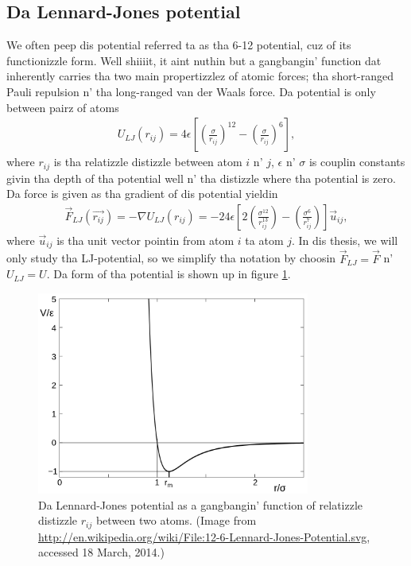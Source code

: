 \subsection{Da Lennard-Jones potential}
We often peep dis potential referred ta as tha 6-12 potential, cuz of its functionizzle form. Well shiiiit, it aint nuthin but a gangbangin' function dat inherently carries tha two main propertizzlez of atomic forces; tha short-ranged Pauli repulsion n' tha long-ranged van der Waals force. Da potential is only between pairz of atoms
\begin{align}
	\label{eq:md_potential_energy}
	U_{LJ}(r_{ij}) = 4\epsilon\left[\left(\frac{\sigma}{r_{ij}}\right)^{12} - \left(\frac{\sigma}{r_{ij}}\right)^{6}\right],
\end{align}
where $r_{ij}$ is tha relatizzle distizzle between atom $i$ n' $j$, $\epsilon$ n' $\sigma$ is couplin constants givin tha depth of tha potential well n' tha distizzle where tha potential is zero. Da force is given as tha gradient of dis potential yieldin 
\begin{align}
	\label{eq:md_lj_force}
	\vec F_{LJ}(\vec{r_{ij}}) = -\nabla U_{LJ}(r_{ij}) = -24\epsilon\left[2\left(\frac{\sigma^{12}}{r_{ij}^{13}}\right) - \left(\frac{\sigma^6}{r_{ij}^7}\right)\right]\vec u_{ij},
\end{align}
where $\vec u_{ij}$ is tha unit vector pointin from atom $i$ ta atom $j$. In dis thesis, we will only study tha LJ-potential, so we simplify tha notation by choosin $\vec F_{LJ} = \vec F$ n' $U_{LJ} = U$. Da form of tha potential is shown up in figure \ref{fig:md_lennard_jones}.
\begin{figure}[h]
\begin{center}
\includegraphics[width=0.8\textwidth, trim=0cm 0cm 0cm 0cm, clip]{MD/figures/lennard_jones.png}
\end{center}
\caption{Da Lennard-Jones potential as a gangbangin' function of relatizzle distizzle $r_{ij}$ between two atoms. (Image from \url{http://en.wikipedia.org/wiki/File:12-6-Lennard-Jones-Potential.svg}, accessed 18 March, 2014.)}
\label{fig:md_lennard_jones}
\end{figure}
